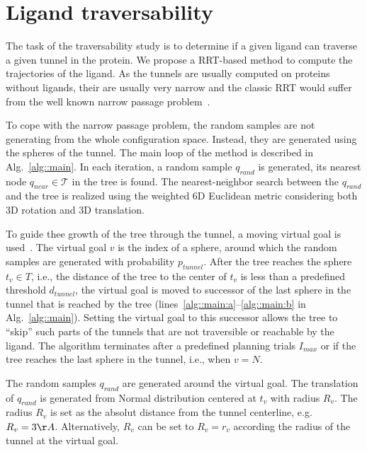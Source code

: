 \documentclass{svmult}
\def\qrand{q_{rand}}
\def\qnear{q_{near}}
\def\T{\mathcal{T}}
\def\C{\mathcal{C}}
\def\dt{d_{tunnel}}
\def\Imax{I_{max}} %
\def\gb{p_{tunnel}}
\begin{document}
\section{Ligand traversability}

The task of the traversability study is to determine if a given ligand can traverse  a given tunnel in the protein.
We propose a RRT-based method to compute the trajectories of the ligand.
As the tunnels are usually computed on proteins without ligands, their are usually very narrow and the classic RRT would
suffer from the well known narrow passage problem~\cite{hannaWIS}.

To cope with the narrow passage problem, the random samples are not generating from the whole configuration space.
Instead, they are generated using the spheres of the tunnel.
The main loop of the method is described in Alg.~\ref{alg::main}.
In each iteration, a random sample $\qrand$ is generated, its nearest node $\qnear\in\T$ in the tree is found.
The nearest-neighbor search between the $\qrand$ and the tree is realized using the weighted 6D Euclidean metric considering
both 3D rotation and 3D translation.

To guide thee growth of the tree through the tunnel, a moving virtual goal is used~\cite{vonasek2009rrt}.
The virtual goal $v$ is the index of a sphere, around which the random samples are generated with probability $\gb$.
After the tree reaches the sphere $t_v \in T$, i.e., the distance of the tree to the center of $t_v$ is
less than a predefined threshold $\dt$, the virtual goal is moved to successor of the last sphere in the tunnel
that is reached by the tree (lines~\ref{alg::main:a}--\ref{alg::main:b} in Alg.~\ref{alg::main}).
Setting the virtual goal to this successor allows the tree to ``skip'' such parts of the tunnels that are
not traversible or reachable by the ligand.
The algorithm terminates after a predefined planning trials $\Imax$ or if the tree reaches
the last sphere in the tunnel, i.e., when $v = N$.

The random samples $\qrand$ are generated around the virtual goal.
The translation of $\qrand$ is generated from Normal distribution centered at $t_v$ with radius $R_v$.
The radius $R_v$ is set as the absolut distance from the tunnel centerline, e.g. $R_v=3\AA$.
Alternatively, $R_v$ can be set to $R_v=r_v$ according the radius of the tunnel at the virtual goal.
\end{document}
